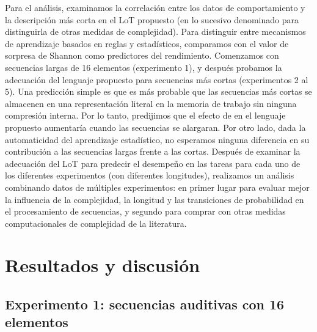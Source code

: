 Para el análisis, examinamos la correlación entre los datos de comportamiento y la descripción más corta en el LoT propuesto (en lo sucesivo denominado \mdlbin para distinguirla de otras medidas de complejidad). Para distinguir entre mecanismos de aprendizaje basados en reglas y estadísticos, comparamos \mdlbin con el valor de sorpresa de Shannon como predictores del rendimiento. Comenzamos con secuencias largas de 16 elementos (experimento 1), y después probamos la adecuación del lenguaje propuesto para secuencias más cortas (experimentos 2 al 5). Una predicción simple es que es más probable que las secuencias más cortas se almacenen en una representación literal en la memoria de trabajo sin ninguna compresión interna. Por lo tanto, predijimos que el efecto de \mdlbin en el lenguaje propuesto aumentaría cuando las secuencias se alargaran. Por otro lado, dada la automaticidad del aprendizaje estadístico, no esperamos ninguna diferencia en su contribución a las secuencias largas frente a las cortas. Después de examinar la adecuación del LoT para predecir el desempeño en las tareas para cada uno de los diferentes experimentos (con diferentes longitudes), realizamos un análisis combinando datos de múltiples experimentos: en primer lugar para evaluar mejor la influencia de la complejidad, la longitud y las transiciones de probabilidad en el procesamiento de secuencias, y segundo para comprar \mdlbin con otras medidas computacionales de complejidad de la literatura. 

\section{Resultados y discusión}

\subsection{Experimento 1: secuencias auditivas con 16 elementos}

